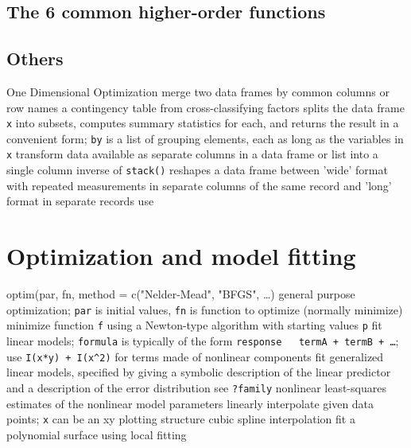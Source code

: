 {\subsection{The 6 common higher-order functions}{}

\subsection{Others}{}
	{One Dimensional Optimization}
	{merge two data frames by com\-mon col\-umns or row names}
	{a contingency table from cross-classi\-fy\-ing factors}
	{splits the data frame {\tt x} into subsets, computes summary statistics for each, and returns the result in a convenient form; {\tt by} is a list of grouping elements, each as long as the variables in {\tt x}}
	{transform data available as se\-pa\-rate col\-umns in a data frame or list into a single column}
	{inverse of {\tt stack()}}
	{reshapes a data frame between 'wide' format
    with re\-pea\-ted mea\-sure\-ments in separate
    columns of the same record and 'long' format in separate records}
	{use}

\section{Optimization and model fitting}{{\smalltt optim(par, fn, method = c("Nelder-Mead", "BFGS", \ldots)} general purpose optimization; {\tt par} is initial values, {\tt fn} is function to optimize (normally minimize)}
	{minimize function {\tt f} using a Newton-type algorithm with starting values {\tt p}}
	{fit linear models; {\tt formula} is typically of the form {\tt response ~ termA + termB + \ldots}; use {\tt I(x*y) + I(x\^{}2)} for terms made of nonlinear components}
	{fit generalized linear models, specified by giving a symbolic description of the linear predictor and a description of the error distribution}
	{see {\tt ?family}}
	{nonlinear least-squares estimates of the nonlinear model parameters}
	{linearly interpolate given data points; {\tt x} can be an xy plotting structure}
	{cubic spline interpolation}
	{fit a polynomial surface using local fitting}

}
